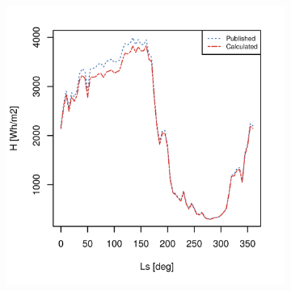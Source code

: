 \begin{figure}[h]
\captionsetup[subfigure]{justification=centering}
\centering
    \setlength{\subfigureWidth}{0.50\textwidth}
    \setlength{\graphicsHeight}{60mm}
    \hypersetup{hidelinks=true}%
    \begin{subfigure}[t]{\subfigureWidth}
        \centering
            \includegraphics[height=\graphicsHeight]{sections/appendix/insolation-calculation-verification/plots/h-exp-calc-at-vl2-with-beta-477-deg.png}
            \label{fig:sub:comparative-global-insolation-at-vl2-beta-equals-phi-daily-variations}
    \end{subfigure}\hfill
    \begin{subfigure}[t]{\subfigureWidth}
        \centering

\end{subfigure}
\end{figure}
